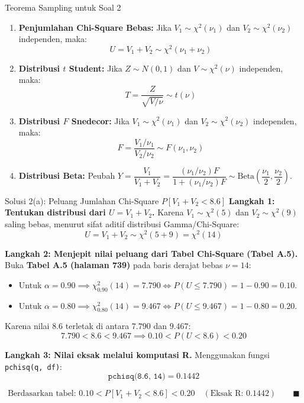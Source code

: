 \documentclass[10pt,twoside]{article}
\begin{document}
\begin{tipbox}{Teorema Sampling untuk Soal 2}
\begin{enumerate}
  \item \textbf{Penjumlahan Chi-Square Bebas:} Jika $V_1 \sim \chi^2(\nu_1)$ dan $V_2 \sim \chi^2(\nu_2)$ independen, maka:
    \[
    U = V_1 + V_2 \sim \chi^2(\nu_1 + \nu_2)
    \]
  \item \textbf{Distribusi $t$ Student:} Jika $Z \sim N(0, 1)$ dan $V \sim \chi^2(\nu)$ independen, maka:
    \[
    T = \frac{Z}{\sqrt{V/\nu}} \sim t(\nu)
    \]
  \item \textbf{Distribusi $F$ Snedecor:} Jika $V_1 \sim \chi^2(\nu_1)$ dan $V_2 \sim \chi^2(\nu_2)$ independen, maka:
    \[
    F = \frac{V_1 / \nu_1}{V_2 / \nu_2} \sim F(\nu_1, \nu_2)
    \]
  \item \textbf{Distribusi Beta:} Peubah $Y = \dfrac{V_1}{V_1 + V_2} = \dfrac{(\nu_1/\nu_2)F}{1 + (\nu_1/\nu_2)F} \sim \text{Beta}\left(\dfrac{\nu_1}{2}, \dfrac{\nu_2}{2}\right)$.
\end{enumerate}
\end{tipbox}

\begin{solbox}{Solusi 2(a): Peluang Jumlahan Chi-Square $P[V_1 + V_2 < 8.6]$}
\textbf{Langkah 1: Tentukan distribusi dari $U = V_1 + V_2$.}
Karena $V_1 \sim \chi^2(5)$ dan $V_2 \sim \chi^2(9)$ saling bebas, menurut sifat aditif distribusi Gamma/Chi-Square:
\[
U = V_1 + V_2 \sim \chi^2(5 + 9) = \chi^2(14)
\]

\textbf{Langkah 2: Menjepit nilai peluang dari Tabel Chi-Square (Tabel A.5).}
Buka \textbf{Tabel A.5 (halaman 739)} pada baris derajat bebas $\nu = 14$:
\begin{itemize}
  \item Untuk $\alpha = 0.90 \implies \chi^2_{0.90}(14) = 7.790 \iff P(U \le 7.790) = 1 - 0.90 = \mathbf{0.10}$.
  \item Untuk $\alpha = 0.80 \implies \chi^2_{0.80}(14) = 9.467 \iff P(U \le 9.467) = 1 - 0.80 = \mathbf{0.20}$.
\end{itemize}
Karena nilai $8.6$ terletak di antara $7.790$ dan $9.467$:
\[
7.790 < 8.6 < 9.467 \implies 0.10 < P(U < 8.6) < 0.20
\]

\textbf{Langkah 3: Nilai eksak melalui komputasi R.}
Menggunakan fungsi \texttt{pchisq(q, df)}:
\[
\texttt{pchisq(8.6, 14)} = \mathbf{0.1442}
\]

\[
\boxed{\text{Berdasarkan tabel: } 0.10 < P[V_1 + V_2 < 8.6] < 0.20 \quad (\text{Eksak R: } 0.1442)} \qquad \blacksquare
\]
\end{solbox}
\end{document}
